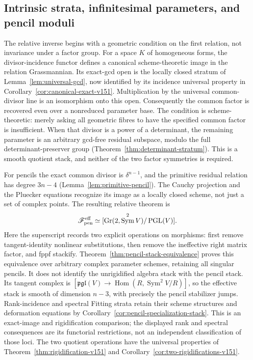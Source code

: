 \documentclass[11pt,reqno]{amsart}
\numberwithin{equation}{section}
\theoremstyle{definition}\newtheorem{definition}[theorem]{Definition}
\theoremstyle{remark}\newtheorem{remark}[theorem]{Remark}
\DeclareMathOperator{\Sym}{Sym}\DeclareMathOperator{\Gr}{Gr}
\DeclareMathOperator{\Hom}{Hom}\DeclareMathOperator{\Tot}{Tot}
\begin{document}
\subsection{Intrinsic strata, infinitesimal parameters, and pencil moduli}
The relative inverse begins with a geometric condition on the first
relation, not invariance under a factor group.  For a space \(K\) of
homogeneous forms, the divisor-incidence functor defines a canonical
scheme-theoretic image in the relation Grassmannian.  Its exact-gcd open
is the locally closed stratum of Lemma~\ref{lem:universal-gcd}, now
identified by its incidence universal property in
Corollary~\ref{cor:canonical-exact-v151}.  Multiplication by the
universal common-divisor line is an isomorphism onto this open.
Consequently the common factor is recovered even over a nonreduced
parameter base.  The condition is scheme-theoretic: merely asking all
geometric fibres to have the specified common factor is insufficient.
When that divisor is a power of a determinant, the remaining
parameter is an arbitrary gcd-free residual subspace, modulo the
full determinant-preserver group
(Theorem~\ref{thm:determinant-stratum}).  This is a smooth quotient
stack, and neither of the two factor symmetries is required.

For pencils the exact common divisor is \(\delta^{n-1}\), and the
primitive residual relation has degree \(3n-4\)
(Lemma~\ref{lem:primitive-pencil}).  The Cauchy projection and the
Pluecker equations recognize its image as a locally closed scheme,
not just a set of complex points.  The resulting relative theorem is
\begin{equation}\label{eq:intro-effective-moduli}
 \mathscr F_{\rm pen}^{\rm eff}\simeq
                [\Gr(2,\Sym^2V)/\PGL(V)].
\end{equation}
Here the superscript records two explicit operations on morphisms:
first remove tangent-identity nonlinear substitutions, then remove
the ineffective right matrix factor, and fppf stackify.
Theorem~\ref{thm:pencil-stack-equivalence} proves this equivalence
over arbitrary complex parameter schemes, retaining all singular
pencils.  It does not identify the unrigidified algebra stack with
the pencil stack.  Its tangent complex is
\([\mathfrak{pgl}(V)\to\Hom(R,\Sym^2V/R)]\), so the effective
stack is smooth of dimension \(n-3\), with precisely the pencil
stabilizer jumps.  Rank-incidence and spectral Fitting strata retain
their scheme structures and deformation equations by
Corollary~\ref{cor:pencil-specialization-stack}.  This is an exact-image and rigidification comparison; the displayed
rank and spectral consequences are its functorial restrictions, not an
independent classification of those loci.  The two quotient operations
have the universal properties of
Theorem~\ref{thm:rigidification-v151} and
Corollary~\ref{cor:two-rigidifications-v151}.
\end{document}
